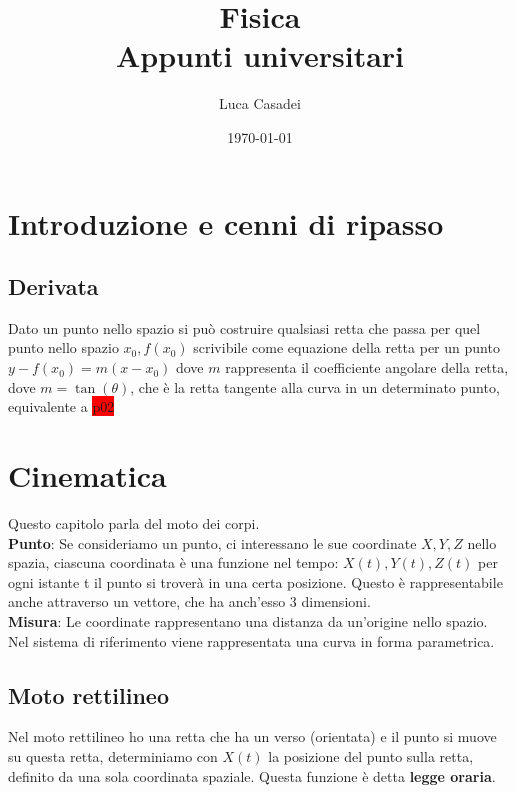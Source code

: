 \documentclass[a4paper,12pt]{report}
\title{\textbf{Fisica}\\Appunti universitari}
\author{Luca Casadei}
\date{\today}
\begin{document}
	\maketitle
	\tableofcontents
	\chapter{Introduzione e cenni di ripasso}
	\section{Derivata}
	Dato un punto nello spazio si può costruire qualsiasi retta che passa per quel punto nello spazio ${x_0,f(x_0)}$ scrivibile come equazione della retta per un punto ${{y - f(x_0)} = m(x-x_0)}$ dove ${m}$ rappresenta il coefficiente angolare della retta, dove ${m = \tan(\theta)}$, che è la retta tangente alla curva in un determinato punto, equivalente a \colorbox{red}{p02}
	\chapter{Cinematica}
	Questo capitolo parla del moto dei corpi.\\
	\textbf{Punto}: Se consideriamo un punto, ci interessano le sue coordinate ${X,Y,Z}$ nello spazia, ciascuna coordinata è una funzione nel tempo:
	${X(t),Y(t),Z(t)}$ per ogni istante t il punto si troverà in una certa posizione. Questo è rappresentabile anche attraverso un vettore, che ha anch'esso 3 dimensioni.\\
	\textbf{Misura}: Le coordinate rappresentano una distanza da un'origine nello spazio.
	Nel sistema di riferimento viene rappresentata una curva in forma parametrica.
	\section{Moto rettilineo}
	Nel moto rettilineo ho una retta che ha un verso (orientata) e il punto si muove su questa retta, determiniamo con ${X(t)}$ la posizione del punto sulla retta, definito da una sola coordinata spaziale. Questa funzione è detta \textbf{legge oraria}.
\end{document}
